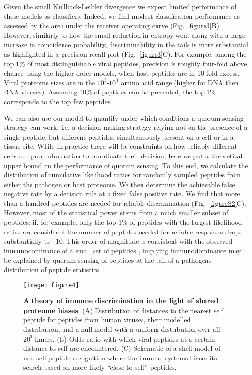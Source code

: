 \documentclass[superscriptaddress,twocolumn,pre]{revtex4}
\newcommand{\<}{\langle}
\renewcommand{\>}{\rangle}
\begin{document}
Given the small Kullback-Leibler divergence we expect limited performance of these models as classifiers. Indeed, we find modest classification performance as assessed by the area under the receiver operating curve (Fig.~\ref{figure3}B). However, similarly to how the small reduction in entropy went along with a large increase in coincidence probability, discriminability in the tails is more substantial as highlighted in a precision-recall plot (Fig.~\ref{figure3}C). For example, among the top 1\% of most distinguishable viral peptides, precision is roughly four-fold above chance using the higher order models, when host peptides are in 10-fold excess. Viral proteome sizes are in the $10^3$-$10^4$ amino acid range (higher for DNA then RNA viruses). Assuming 10\% of peptides can be presented, the top 1\% corresponds to the top few peptides.

We can also use our model to quantify under which conditions a quorum sensing strategy can work, i.e. a decision-making strategy relying not on the presence of a single peptide, but  different peptides, simultaneously present on a cell or in a tissue site. While in practice there will be constraints on how reliably different cells can pool information to coordinate their decision, here we put a theoretical upper bound on the performance of quorum sensing. To this end, we calculate the distribution of cumulative likelihood ratios for  randomly sampled peptides from either the pathogen or host proteome. We then determine the achievable false negative rate by a decision rule at a fixed false positive rate. We find that more than a hundred peptides are needed for reliable discrimination (Fig.~\ref{figureS2}C). However, most of the statistical power stems from a much smaller subset of peptides: if, for example, only the top 1\% of peptides with the largest likelihood ratios are considered the number of peptides needed for reliable responses drops substantially to ~10. This order of magnitude is consistent with the observed immunodominance of a small set of peptides \cite{REF NEEDED}, implying immunodominance may be explained by quorum sensing of peptides at the tail of a pathogens distribution of peptide statistics.


\begin{figure*}
    \begin{center}
        \texttt{[image: figure4]}
    \end{center}
    \caption{
        {\bf A theory of immune discrimination in the light of shared proteome biases.}
        (A) Distribution of distances to the nearest self peptide for peptides from human viruses, their modelled distribution, and a null model with a uniform distribution over all $20^9$ kmers. (B) Odds ratio with which viral peptides at a certain distance to self are encountered. (C) Schematic of a shell-model of non-self peptide recognition where the immune systems biases its search based on more likely “close to self” peptides. 
    \label{figure4}
    }
\end{figure*}
\end{document}
